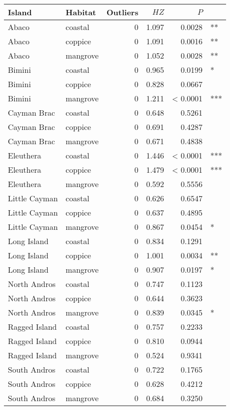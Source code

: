 
\begin{tabular}{llrrrl}
\toprule
Island & Habitat & Outliers & $HZ$ & $P$ & \\
\midrule
Abaco & coastal & 0 & 1.097 & 0.0028 & **\\
Abaco & coppice & 0 & 1.091 & 0.0016 & **\\
Abaco & mangrove & 0 & 1.052 & 0.0028 & **\\
Bimini & coastal & 0 & 0.965 & 0.0199 & *\\
Bimini & coppice & 0 & 0.828 & 0.0667 & \\
Bimini & mangrove & 0 & 1.211 & < 0.0001 & ***\\
Cayman Brac & coastal & 0 & 0.648 & 0.5261 & \\
Cayman Brac & coppice & 0 & 0.691 & 0.4287 & \\
Cayman Brac & mangrove & 0 & 0.671 & 0.4838 & \\
Eleuthera & coastal & 0 & 1.446 & < 0.0001 & ***\\
Eleuthera & coppice & 0 & 1.479 & < 0.0001 & ***\\
Eleuthera & mangrove & 0 & 0.592 & 0.5556 & \\
Little Cayman & coastal & 0 & 0.626 & 0.6547 & \\
Little Cayman & coppice & 0 & 0.637 & 0.4895 & \\
Little Cayman & mangrove & 0 & 0.867 & 0.0454 & *\\
Long Island & coastal & 0 & 0.834 & 0.1291 & \\
Long Island & coppice & 0 & 1.001 & 0.0034 & **\\
Long Island & mangrove & 0 & 0.907 & 0.0197 & *\\
North Andros & coastal & 0 & 0.747 & 0.1123 & \\
North Andros & coppice & 0 & 0.644 & 0.3623 & \\
North Andros & mangrove & 0 & 0.839 & 0.0345 & *\\
Ragged Island & coastal & 0 & 0.757 & 0.2233 & \\
Ragged Island & coppice & 0 & 0.810 & 0.0944 & \\
Ragged Island & mangrove & 0 & 0.524 & 0.9341 & \\
South Andros & coastal & 0 & 0.722 & 0.1765 & \\
South Andros & coppice & 0 & 0.628 & 0.4212 & \\
South Andros & mangrove & 0 & 0.684 & 0.3250 & \\
\bottomrule
\end{tabular}